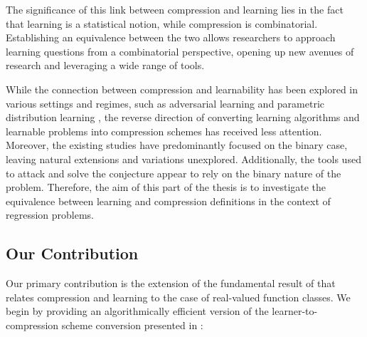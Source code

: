 The significance of this link between compression and learning lies in the fact that learning is a statistical notion, while compression is combinatorial. Establishing an equivalence between the two allows researchers to approach learning questions from a combinatorial perspective, opening up new avenues of research and leveraging a wide range of tools.

While the connection between compression and learnability has been explored in various settings and regimes, such as adversarial learning \citep{DBLP:conf/colt/MontasserHS19} and parametric distribution learning \citep{ashtiani2020near}, the reverse direction of converting learning algorithms and learnable problems into compression schemes has received less attention. Moreover, the existing studies have predominantly focused on the binary case, leaving natural extensions and variations unexplored. Additionally, the tools used to attack and solve the conjecture appear to rely on the binary nature of the problem. Therefore, the aim of this part of the thesis is to investigate the equivalence between learning and compression definitions in the context of regression problems.

\subsection{Our Contribution}

Our primary contribution is the extension of the fundamental result of \citet{moran2016sample} that relates compression and learning to the case of real-valued function classes. We begin by providing an algorithmically efficient version of the learner-to-compression scheme conversion presented in \citet{moran2016sample}:


